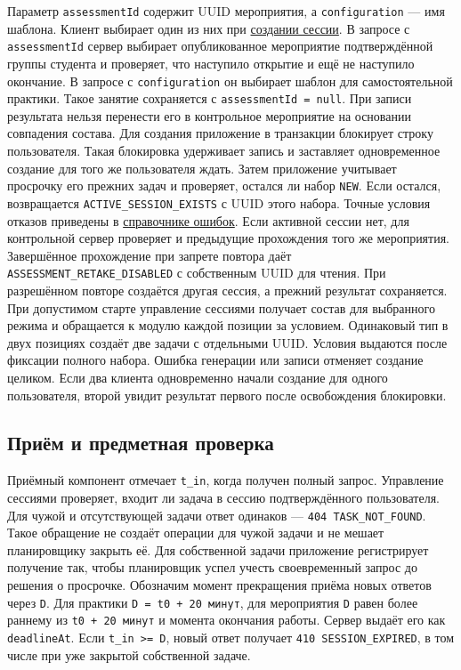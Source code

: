 \documentclass[12pt,a4paper]{article}
\begin{document}
Параметр \texttt{assessmentId} содержит UUID мероприятия, а \texttt{configuration} --- имя шаблона. Клиент выбирает один из них при {\href{DOC-08\_Справочник\_API.pdf\#1-создание-сессии}{создании сессии}}. В запросе с \texttt{assessmentId} сервер выбирает опубликованное мероприятие подтверждённой группы студента и проверяет, что наступило открытие и ещё не наступило окончание. В запросе с \texttt{configuration} он выбирает шаблон для самостоятельной практики. Такое занятие сохраняется с \texttt{assessmentId\ =\ null}. При записи результата нельзя перенести его в контрольное мероприятие на основании совпадения состава. Для создания приложение в транзакции блокирует строку пользователя. Такая блокировка удерживает запись и заставляет одновременное создание для того же пользователя ждать. Затем приложение учитывает просрочку его прежних задач и проверяет, остался ли набор \texttt{NEW}. Если остался, возвращается \texttt{ACTIVE\_\allowbreak{}SESSION\_\allowbreak{}EXISTS} с UUID этого набора. Точные условия отказов приведены в {\href{DOC-08\_Справочник\_API.pdf\#4-ошибки}{справочнике ошибок}}. Если активной сессии нет, для контрольной сервер проверяет и предыдущие прохождения того же мероприятия. Завершённое прохождение при запрете повтора даёт \texttt{ASSESSMENT\_\allowbreak{}RETAKE\_\allowbreak{}DISABLED} с собственным UUID для чтения. При разрешённом повторе создаётся другая сессия, а прежний результат сохраняется. При допустимом старте управление сессиями получает состав для выбранного режима и обращается к модулю каждой позиции за условием. Одинаковый тип в двух позициях создаёт две задачи с отдельными UUID. Условия выдаются после фиксации полного набора. Ошибка генерации или записи отменяет создание целиком. Если два клиента одновременно начали создание для одного пользователя, второй увидит результат первого после освобождения блокировки.

\subsection{Приём и предметная проверка}\label{ux43fux440ux438ux451ux43c-ux438-ux43fux440ux435ux434ux43cux435ux442ux43dux430ux44f-ux43fux440ux43eux432ux435ux440ux43aux430}

\hypertarget{приём-и-предметная-проверка}{}

Приёмный компонент отмечает \texttt{t\_in}, когда получен полный запрос. Управление сессиями проверяет, входит ли задача в сессию подтверждённого пользователя. Для чужой и отсутствующей задачи ответ одинаков --- \texttt{404 TASK\_\allowbreak{}NOT\_\allowbreak{}FOUND}. Такое обращение не создаёт операции для чужой задачи и не мешает планировщику закрыть её. Для собственной задачи приложение регистрирует получение так, чтобы планировщик успел учесть своевременный запрос до решения о просрочке. Обозначим момент прекращения приёма новых ответов через \texttt{D}. Для практики \texttt{D\ =\ t0\ +\ 20\ минут}, для мероприятия \texttt{D} равен более раннему из \texttt{t0\ +\ 20\ минут} и момента окончания работы. Сервер выдаёт его как \texttt{deadlineAt}. Если \texttt{t\_in\ \textgreater{}=\ D}, новый ответ получает \texttt{410 SESSION\_\allowbreak{}EXPIRED}, в том числе при уже закрытой собственной задаче.
\end{document}
